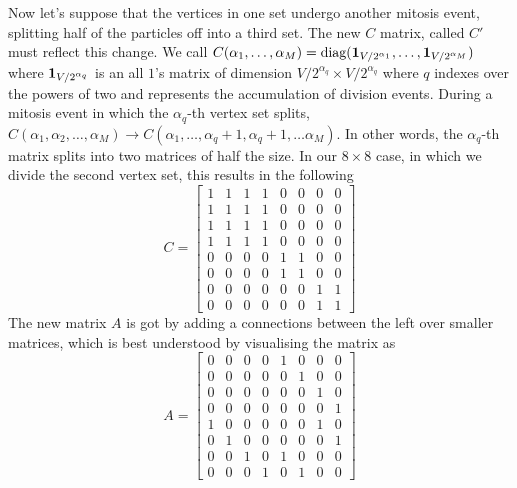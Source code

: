 Now let's suppose that the vertices in one set undergo another mitosis event, splitting half of the particles
off into a third set. The new $C$ matrix, called $C'$ must reflect this change. We call 
$C(\alpha_1, \ldots, \alpha_M) = \textrm{diag}(\vb{1}_{V/2^{\alpha_1}}, \ldots,\vb{1}_{V/2^{\alpha_M}} )$ where $\vb{1}_{V/2^{\alpha_q}}$
is an all $1$'s matrix of dimension $V/2^{\alpha_q} \times V/2^{\alpha_q}$ where $q$ indexes over the powers 
of two and represents the accumulation of division events. During a mitosis event in which the $\alpha_q$-th vertex set
splits, $C(\alpha_1, \alpha_2, \ldots, \alpha_M) \rightarrow 
C(\alpha_1, \ldots, \alpha_q+1,\alpha_q+1 , \ldots\alpha_M)$. In other words, the $\alpha_q$-th matrix splits into
two matrices of half the size. In our $8 \times 8$ case, in which we divide the second vertex set, this results
in the following
\begin{equation*}
    C = 
    \begin{bmatrix}
    1 & 1 & 1 & 1 & 0 & 0 & 0 & 0 \\
    1 & 1 & 1 & 1 & 0 & 0 & 0 & 0 \\
    1 & 1 & 1 & 1 & 0 & 0 & 0 & 0 \\
    1 & 1 & 1 & 1 & 0 & 0 & 0 & 0 \\
    0 & 0 & 0 & 0 & 1 & 1 & 0 & 0 \\
    0 & 0 & 0 & 0 & 1 & 1 & 0 & 0 \\
    0 & 0 & 0 & 0 & 0 & 0 & 1 & 1 \\
    0 & 0 & 0 & 0 & 0 & 0 & 1 & 1 
    \end{bmatrix}
\end{equation*}
The new matrix $A$ is got by adding a connections between the left over smaller matrices, which
is best understood by visualising the matrix as
\begin{equation*}
    A = 
    \begin{bmatrix}
    0 & 0 & 0 & 0 & 1 & 0 & 0 & 0 \\
    0 & 0 & 0 & 0 & 0 & 1 & 0 & 0 \\
    0 & 0 & 0 & 0 & 0 & 0 & 1 & 0 \\
    0 & 0 & 0 & 0 & 0 & 0 & 0 & 1 \\
    1 & 0 & 0 & 0 & 0 & 0 & 1 & 0 \\
    0 & 1 & 0 & 0 & 0 & 0 & 0 & 1 \\
    0 & 0 & 1 & 0 & 1 & 0 & 0 & 0 \\
    0 & 0 & 0 & 1 & 0 & 1 & 0 & 0 
    \end{bmatrix}
\end{equation*}
